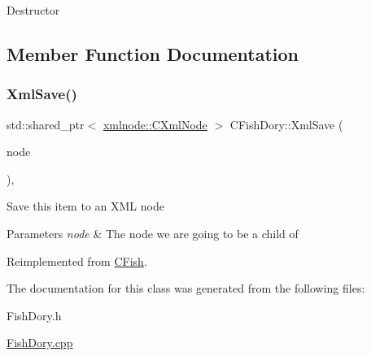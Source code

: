 Destructor 

\subsection{Member Function Documentation}
\mbox{\label{class_c_fish_dory_ac906b7f952cdbc52a72d1e87c9228ad9}} 
\subsubsection{\texorpdfstring{Xml\+Save()}{XmlSave()}}
{\footnotesize\ttfamily std\+::shared\+\_\+ptr$<$ \mbox{\hyperlink{classxmlnode_1_1_c_xml_node}{xmlnode\+::\+C\+Xml\+Node}} $>$ C\+Fish\+Dory\+::\+Xml\+Save (\begin{DoxyParamCaption}\item[{const std\+::shared\+\_\+ptr$<$ \mbox{\hyperlink{classxmlnode_1_1_c_xml_node}{xmlnode\+::\+C\+Xml\+Node}} $>$ \&}]{node }\end{DoxyParamCaption})\hspace{0.3cm}{\ttfamily [override]}, {\ttfamily [virtual]}}

Save this item to an X\+ML node 
\begin{DoxyParams}{Parameters}
{\em node} & The node we are going to be a child of \\
\hline
\end{DoxyParams}


Reimplemented from \mbox{\hyperlink{class_c_fish_abfc997d2d755be8f94069c57e75a854b}{C\+Fish}}.



The documentation for this class was generated from the following files\+:\begin{DoxyCompactItemize}
\item 
Fish\+Dory.\+h\item 
\mbox{\hyperlink{_fish_dory_8cpp}{Fish\+Dory.\+cpp}}\end{DoxyCompactItemize}
